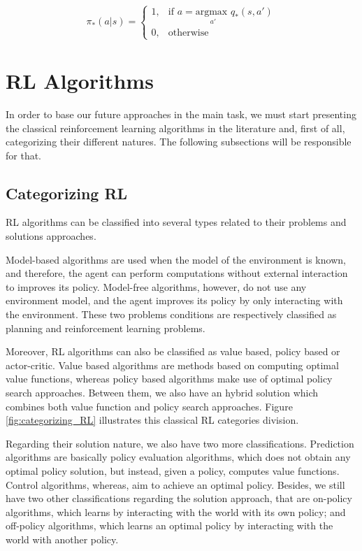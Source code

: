 \begin{equation}
 \pi_*(a | s) = 
\begin{cases}
    1,& \text{if } a = \underset{a'}{\textrm{argmax }} q_*(s,a')\\
    0,& \text{otherwise}
\end{cases}
\label{eq:policy_from_greedy}
\end{equation}

\section{RL Algorithms}

In order to base our future approaches in the main task, we must start presenting the classical reinforcement learning algorithms in the literature and, first of all, categorizing their different natures. The following subsections will be responsible for that.

\subsection{Categorizing RL}

RL algorithms can be classified into several types related to their problems and solutions approaches.


Model-based algorithms are used when the model of the environment is known, and therefore, the agent can perform computations without external interaction to improves its policy. Model-free algorithms, however, do not use any environment model, and the agent improves its policy by only interacting with the environment. These two problems conditions are respectively classified as planning and reinforcement learning problems.

Moreover, RL algorithms can also be classified as value based, policy based or actor-critic. Value based algorithms are methods based on computing optimal value functions, whereas policy based algorithms make use of optimal policy search approaches. Between them, we also have an hybrid solution which combines both value function and policy search approaches. Figure \ref{fig:categorizing_RL} illustrates this classical RL categories division.

Regarding their solution nature, we also have two more classifications. Prediction algorithms are basically policy evaluation algorithms, which does not obtain any optimal policy solution, but instead, given a policy, computes value functions. Control algorithms, whereas, aim to achieve an optimal policy. Besides, we still have two other classifications regarding the solution approach, that are on-policy algorithms, which learns by interacting with the world with its own policy; and off-policy algorithms, which learns an optimal policy by interacting with the world with another policy.

